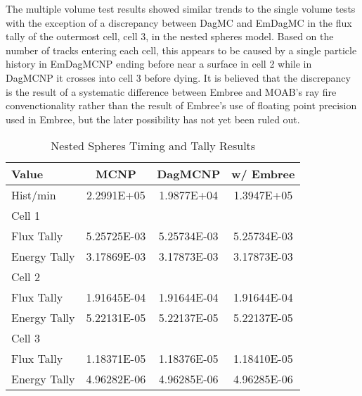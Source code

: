 \documentclass{anstrans}
\begin{document}
The multiple volume test results showed similar trends to the single volume tests with the exception of a discrepancy between DagMC and EmDagMC in the flux tally of the outermost cell, cell 3, in the nested spheres model. Based on the number of tracks entering each cell, this appears to be caused by a single particle history in EmDagMCNP ending before near a surface in cell 2 while in DagMCNP it crosses into cell 3 before dying. It is believed that the discrepancy is the result of a systematic difference between Embree and MOAB's ray fire convenctionality rather than the result of Embree's use of floating point precision used in Embree, but the later possibility has not yet been ruled out.

\begin{table}[h]

  \begin{center}
    \caption{Nested Spheres Timing and Tally Results}
    
    \begin{tabular}{lccc}
      \toprule
      Value & MCNP & DagMCNP & w/ Embree \\
      \toprule
      Hist/min & 2.2991E+05 & 1.9877E+04 & 1.3947E+05 \\
      \hline
      Cell 1 & & & \\
      Flux Tally & 5.25725E-03 & 5.25734E-03 & 5.25734E-03 \\
      Energy Tally & 3.17869E-03 &  3.17873E-03 &  3.17873E-03 \\
      \hline
      Cell 2 & & & \\
      Flux Tally & 1.91645E-04 & 1.91644E-04 & 1.91644E-04 \\
      Energy Tally & 5.22131E-05 & 5.22137E-05 & 5.22137E-05 \\
      \hline
      Cell 3 & & & \\
      Flux Tally & 1.18371E-05 & 1.18376E-05 & 1.18410E-05 \\
      Energy Tally & 4.96282E-06 & 4.96285E-06 & 4.96285E-06 \\
      \bottomrule
                        
    \end{tabular}


  \end{center}

\end{table}
\end{document}

